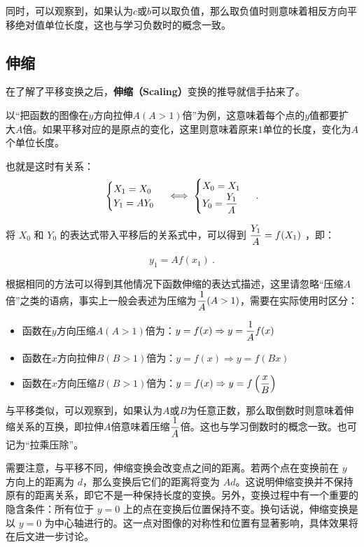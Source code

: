 同时，可以观察到，如果认为$c$或$b$可以取负值，那么取负值时则意味着相反方向平移绝对值单位长度，这也与学习负数时的概念一致。

\subsection{伸缩}\label{sub_FunTra_2}

在了解了平移变换之后，\textbf{伸缩（Scaling）}变换的推导就信手拈来了。

以“把函数的图像在$y$方向拉伸$A(A>1)$倍”为例，这意味着每个点的$y$值都要扩大$A$倍。如果平移对应的是原点的变化，这里则意味着原来$1$单位的长度，变化为$A$个单位长度。

也就是这时有关系：
\begin{equation}
\begin{cases}
X_1=X_0\\
Y_1=AY_0
\end{cases}\iff
\begin{cases}
X_0=X_1\\
\displaystyle Y_0={Y_1\over A}
\end{cases}~.
\end{equation}

将  $X_0$  和  $Y_0$  的表达式带入平移后的关系式中，可以得到  $\displaystyle{Y_1\over A} = f(X_1 )$ ，即：

\begin{equation}
y_1=Af(x_1)~.
\end{equation}

根据相同的方法可以得到其他情况下函数伸缩的表达式描述，这里请忽略“压缩$A$倍”之类的语病，事实上一般会表述为压缩为$\displaystyle{1\over A}(A>1)$，需要在实际使用时区分：

\begin{itemize}
\item 函数在$y$方向压缩$A(A>1)$倍为：$\displaystyle y=f(x)\Rightarrow y={1\over A}f(x)$
\item 函数在$x$方向拉伸$B(B>1)$倍为：$y=f(x)\Rightarrow y=f(Bx)$
\item 函数在$x$方向压缩$B(B>1)$倍为：$\displaystyle y=f(x)\Rightarrow y=f\left({x\over B}\right)$
\end{itemize}

与平移类似，可以观察到，如果认为$A$或$B$为任意正数，那么取倒数时则意味着伸缩关系的互换，即拉伸$A$倍意味着压缩$\displaystyle {1\over A}$倍。这也与学习倒数时的概念一致。也可记为“拉乘压除”。

需要注意，与平移不同，伸缩变换会改变点之间的距离。若两个点在变换前在 $y$ 方向上的距离为 $d$，那么变换后它们的距离将变为 $A d$。这说明伸缩变换并不保持原有的距离关系，即它不是一种保持长度的变换。另外，变换过程中有一个重要的隐含条件：所有位于 $y = 0$ 上的点在变换后位置保持不变。换句话说，伸缩变换是以 $y = 0$ 为中心轴进行的。这一点对图像的对称性和位置有显著影响，具体效果将在后文进一步讨论。

